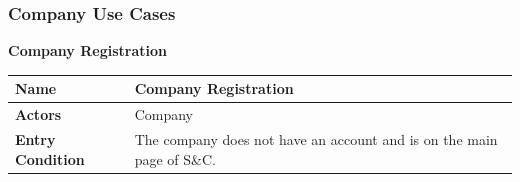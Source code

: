     \subsubsection{Company Use Cases}
        \begin{enumerate}[label=\textbf{[US\arabic*]}, left = 0pt, align = left, resume]
            \item \textbf{Company Registration}
        
            \begin{longtable}{|l|p{11cm}|}  
                \hline
                \textbf{Name} & 
                    \textbf{Company Registration} \\
                \hline
                
                \textbf{Actors} & 
                    Company \\
                \hline
                
                \textbf{Entry Condition} & 
                    The company does not have an account and is on the main page of S\&C. \\
                \hline
                

\end{longtable}
\end{enumerate}
